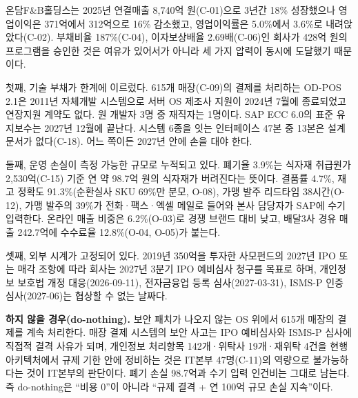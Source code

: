 \documentclass[10pt,a4paper]{article}
\begin{document}
\begin{fieldbox}
\ifwbblank
{}
\else
온담F\&B홀딩스는 2025년 연결매출 8,740억 원(C-01)으로 3년간 18\% 성장했으나 영업이익은 371억에서 312억으로 16\% 감소했고, 영업이익률은 5.0\%에서 3.6\%로 내려앉았다(C-02). 부채비율 187\%(C-04), 이자보상배율 2.69배(C-06)인 회사가 428억 원의 프로그램을 승인한 것은 여유가 있어서가 아니라 세 가지 압력이 동시에 도달했기 때문이다.

첫째, 기술 부채가 한계에 이르렀다. 615개 매장(C-09)의 결제를 처리하는 OD-POS 2.1은 2011년 자체개발 시스템으로 서버 OS 제조사 지원이 2024년 7월에 종료되었고 연장지원 계약도 없다. 원 개발자 3명 중 재직자는 1명이다. SAP ECC 6.0의 표준 유지보수는 2027년 12월에 끝난다. 시스템 6종을 잇는 인터페이스 47본 중 13본은 설계문서가 없다(C-18). 어느 쪽이든 2027년 안에 손을 대야 한다.

둘째, 운영 손실이 측정 가능한 규모로 누적되고 있다. 폐기율 3.9\%는 식자재 취급원가 2,530억(C-15) 기준 연 약 98.7억 원의 식자재가 버려진다는 뜻이다. 결품률 4.7\%, 재고 정확도 91.3\%(순환실사 SKU 69\%만 분모, O-08), 가맹 발주 리드타임 38시간(O-12), 가맹 발주의 39\%가 전화·팩스·엑셀 메일로 들어와 본사 담당자가 SAP에 수기 입력한다. 온라인 매출 비중은 6.2\%(O-03)로 경쟁 브랜드 대비 낮고, 배달3사 경유 매출 242.7억에 수수료율 12.8\%(O-04, O-05)가 붙는다.

셋째, 외부 시계가 고정되어 있다. 2019년 350억을 투자한 사모펀드의 2027년 IPO 또는 매각 조항에 따라 회사는 2027년 3분기 IPO 예비심사 청구를 목표로 하며, 개인정보 보호법 개정 대응(2026-09-11), 전자금융업 등록 심사(2027-03-31), ISMS-P 인증 심사(2027-06)는 협상할 수 없는 날짜다.

\textbf{하지 않을 경우(do-nothing).} 보안 패치가 나오지 않는 OS 위에서 615개 매장의 결제를 계속 처리한다. 매장 결제 시스템의 보안 사고는 IPO 예비심사와 ISMS-P 심사에 직접적 결격 사유가 되며, 개인정보 처리항목 142개·위탁사 19개·재위탁 4건을 현행 아키텍처에서 규제 기한 안에 정비하는 것은 IT본부 47명(C-11)의 역량으로 불가능하다는 것이 IT본부의 판단이다. 폐기 손실 98.7억과 수기 입력 인건비는 그대로 남는다. 즉 do-nothing은 “비용 0”이 아니라 “규제 결격 + 연 100억 규모 손실 지속”이다.
\fi
\end{fieldbox}
\end{document}
